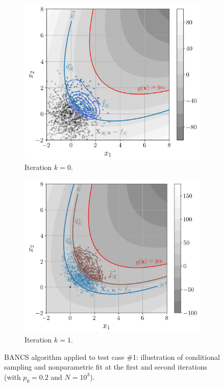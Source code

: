 \begin{figure}
    \centering
    \begin{subfigure}[b]{0.49\linewidth}
        \centering
        \includegraphics[width=\linewidth]{part3/figures/BANCS/bancs_illustration0.jpg}
        \caption{Iteration $k=0$.}
    \end{subfigure}
    \begin{subfigure}[b]{0.49\linewidth}
        \centering
        \includegraphics[width=\linewidth]{part3/figures/BANCS/bancs_illustration1.jpg}
        \caption{Iteration $k=1$.}
    \end{subfigure}
    \caption{BANCS algorithm applied to test case \#1: illustration of conditional sampling and nonparametric fit at the first and second iterations (with $p_0=0.2$ and $N=10^3$).}
    \label{fig:bancs_illustration}
\end{figure}


